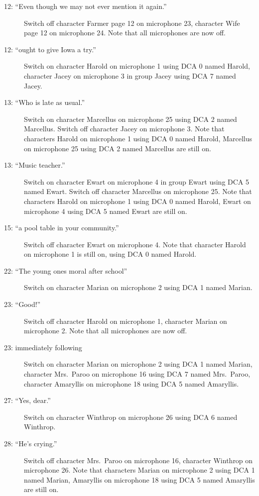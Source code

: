 \begin{description}
\item[12: ``Even though we may not ever mention it again.'']
Switch off character Farmer page 12 on microphone 23, character Wife page 12 on microphone 24. Note that all microphones are now off.

\item[12: ``ought to give Iowa a try.'']
Switch on character Harold on microphone 1 using DCA 0 named Harold, character Jacey on microphone 3 in group Jacey using DCA 7 named Jacey. 

\item[13: ``Who is late as usual.'']
Switch on character Marcellus on microphone 25 using DCA 2 named Marcellus. Switch off character Jacey on microphone 3. Note that characters Harold on microphone 1 using DCA 0 named Harold, Marcellus on microphone 25 using DCA 2 named Marcellus are still on.  

\item[13: ``Music teacher.'']
Switch on character Ewart on microphone 4 in group Ewart using DCA 5 named Ewart. Switch off character Marcellus on microphone 25. Note that characters Harold on microphone 1 using DCA 0 named Harold, Ewart on microphone 4 using DCA 5 named Ewart are still on.  

\item[15: ``a pool table in your community.'']
Switch off character Ewart on microphone 4. Note that character Harold on microphone 1 is still on, using DCA 0 named Harold.

\item[22: ``The young ones moral after school'']
Switch on character Marian on microphone 2 using DCA 1 named Marian. 

\item[23: ``Good!'']
Switch off character Harold on microphone 1, character Marian on microphone 2. Note that all microphones are now off.

\item[23: immediately following]
Switch on character Marian on microphone 2 using DCA 1 named Marian, character Mrs.~Paroo on microphone 16 using DCA 7 named Mrs.~Paroo, character Amaryllis on microphone 18 using DCA 5 named Amaryllis. 

\item[27: ``Yes, dear.'']
Switch on character Winthrop on microphone 26 using DCA 6 named Winthrop. 

\item[28: ``He's crying.'']
Switch off character Mrs.~Paroo on microphone 16, character Winthrop on microphone 26. Note that characters Marian on microphone 2 using DCA 1 named Marian, Amaryllis on microphone 18 using DCA 5 named Amaryllis are still on.  


\end{description}
